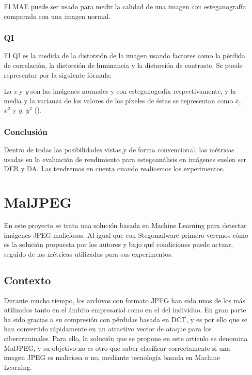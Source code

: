 El \ac{MAE} puede ser usado para medir la calidad de una imagen con esteganografía comparada con una imagen normal.

\subsubsection{QI}

El \ac{QI} es la medida de la distorsión de la imagen usando factores como la pérdida de correlación, la distorsión de luminancia y la distorsión de contraste. Se puede representar por la siguiente fórmula:


La \textit{x} y \textit{y} son las imágenes normales y con esteganografía respectivamente, y la media y la varianza de los valores de los píxeles de éstas se representan como \textit{$\bar{x}$}, \textit{$x^{2}$} y \textit{$\bar{y}$}, \textit{$y^{2}$} (\cite{qi}).%

\subsubsection{Conclusión}

Dentro de todas las posibilidades vistas,y de forma convencional, las métricas usadas en la evaluación de rendimiento para estegoanálisis en imágenes suelen ser \ac{DER} y \ac{DA}. Las tendremos en cuenta cuando realicemos los experimentos.

\section{MalJPEG}

En este proyecto se trata una solución basada en Machine Learning para detectar imágenes JPEG maliciosas. Al igual que con Stegomalware primero veremos cómo es la solución propuesta por los autores y bajo qué condiciones puede actuar, seguido de las métricas utilizadas para sus experimentos.

\subsection{Contexto}

Durante mucho tiempo, los archivos con formato JPEG han sido unos de los más utilizados tanto en el ámbito empresarial como en el del individuo. En gran parte ha sido gracias a su compresión con pérdidas basada en \ac{DCT}, y es por ello que se han convertido rápidamente en un atractivo vector de ataque para los cibercriminales. Para ello, la solución que se propone en este artículo se denomina MalJPEG, y su objetivo no es otro que saber clasificar correctamente si una imagen JPEG es maliciosa o no, mediante tecnología basada en Machine Learning.

